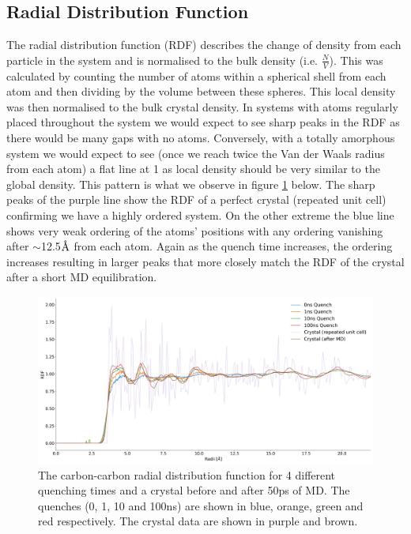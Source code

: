 \subsection{Radial Distribution Function}
The radial distribution function (RDF) describes the change of density from each particle in the system and is normalised to the bulk density (i.e. $\frac{N}{V}$). This was calculated by counting the number of atoms within a spherical shell from each atom and then dividing by the volume between these spheres. This local density was then normalised to the bulk crystal density. In systems with atoms regularly placed throughout the system we would expect to see sharp peaks in the RDF as there would be many gaps with no atoms. Conversely, with a totally amorphous system we would expect to see (once we reach twice the Van der Waals radius from each atom) a flat line at 1 as local density should be very similar to the global density. This pattern is what we observe in figure \ref{fig:RDF} below. The sharp peaks of the purple line show the RDF of a perfect crystal (repeated unit cell) confirming we have a highly ordered system. On the other extreme the blue line shows very weak ordering of the atoms' positions with any ordering vanishing after $\sim$12.5$\text{\normalfont\AA}$ from each atom. Again as the quench time increases, the ordering increases resulting in larger peaks that more closely match the RDF of the crystal after a short MD equilibration.
\begin{figure}[h]
	\includegraphics[width=\textwidth]{./img/DifferentQuenchTimes/RDF.png}
	\caption{\label{fig:RDF}The carbon-carbon radial distribution function for 4 different quenching times and a crystal before and after 50ps of MD. The quenches (0, 1, 10 and 100ns) are shown in blue, orange, green and red respectively. The crystal data are shown in purple and brown.}
\end{figure}

